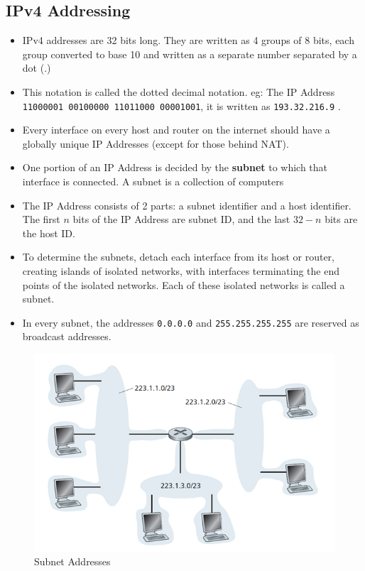 \documentclass[a4paper]{article}
\theoremstyle{plain}
\theoremstyle{definition}
\begin{document}
\subsection{IPv4 Addressing}
\begin{itemize}
    \item IPv4 addresses are 32 bits long. They are written as 4 groups of 8 bits, each group converted to base 10 and written as a separate number separated by a dot (.)
    
    \item This notation is called the dotted decimal notation. eg: The IP Address \texttt{11000001 00100000 11011000 00001001}, it is written as \texttt{193.32.216.9} .
    
    \item Every interface on every host and router on the internet should have a globally unique IP Addresses (except for those behind NAT). 
    
    \item One portion of an IP Address is decided by the \textbf{subnet} to which that interface is connected. A subnet is a collection of computers 
    
    \item The IP Address consists of 2 parts: a subnet identifier and a host identifier. The first $n$ bits of the IP Address are subnet ID, and the last $32-n$ bits are the host ID. 
    
    \item To determine the subnets, detach each interface from its host or router, creating islands of isolated networks, with interfaces terminating the end points of the isolated networks. Each of these isolated networks is called a subnet. 
    
    \item In every subnet, the addresses \texttt{0.0.0.0} and \texttt{255.255.255.255} are reserved as broadcast addresses. 
\end{itemize}

\begin{figure}[!h]
    \centering
    \includegraphics[scale=0.7]{cn7.png}
    \caption{Subnet Addresses}
    \label{fig:my_label_7}
\end{figure}
\end{document}
